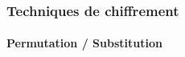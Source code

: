         \begin{frame}
            \frametitle{Techniques de chiffrement}
            \framesubtitle{Permutation / Substitution}
            \begin{columns}
                \begin{column}{.4\linewidth}
                    \\
                    \pause
                    \pause
                    \begin{columns}
                        \begin{column}{.5\linewidth}
                            \centering{\textcolor{green}{Rapide}}
                        \end{column}

                        \begin{column}{.5\linewidth}
                            \centering{\textcolor{red}{Moins sécurisée}}
                        \end{column}
                    \end{columns}
                \end{column}


\end{columns}
\end{frame}
